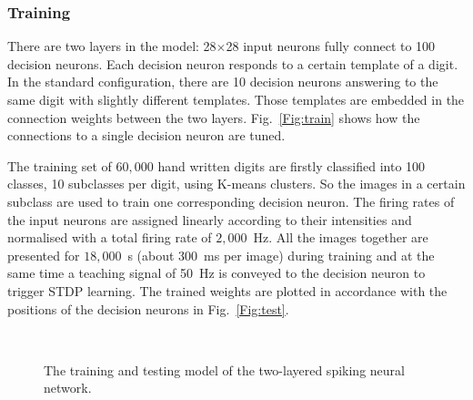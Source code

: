 \documentclass[journal]{journal}
\begin{document}
	\subsubsection{Training}
	
	There are two layers in the model: 28$\times$28 input neurons fully connect to 100 decision neurons.
	Each decision neuron responds to a certain template of a digit.
	In the standard configuration, there are 10 decision neurons answering to the same digit with slightly different templates.
	Those templates are embedded in the connection weights between the two layers.
	Fig.~\ref{Fig:train} shows how the connections to a single decision neuron are tuned.
	
	The training set of $60,000$ hand written digits are firstly classified into 100 classes, 10 subclasses per digit, using K-means clusters.
	So the images in a certain subclass are used to train one corresponding decision neuron.
	The firing rates of the input neurons are assigned linearly according to their intensities and normalised with a total firing rate of $2,000$~Hz.
	All the images together are presented for $18,000$~s (about 300~ms per image) during training and at the same time a teaching signal of 50~Hz is conveyed to the decision neuron to trigger STDP learning.
	The trained weights are plotted in accordance with the positions of the decision neurons in Fig.~\ref{Fig:test}.
	\begin{figure}[thb!]
		\centering
		 \\
		
		\centering
		
		
		\caption{The training and testing model of the two-layered spiking neural network.}
		\label{fig:model}
	\end{figure}
\end{document}
